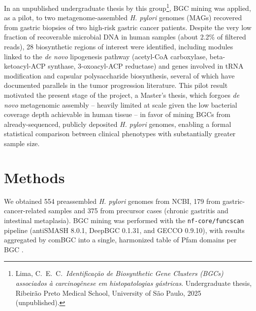 \documentclass[12pt]{article}
\begin{document}
In an unpublished undergraduate thesis by this group\footnote{Lima, C.\ E.\ C.\ \textit{Identificação de Biosynthetic Gene Clusters (BGCs) associados à carcinogênese em histopatologias gástricas}. Undergraduate thesis, Ribeirão Preto Medical School, University of São Paulo, 2025 (unpublished).}, BGC mining was applied, as a pilot, to two metagenome-assembled \textit{H. pylori} genomes (MAGs) recovered from gastric biopsies of two high-risk gastric cancer patients. Despite the very low fraction of recoverable microbial DNA in human samples (about 2.2\% of filtered reads), 28 biosynthetic regions of interest were identified, including modules linked to the \textit{de novo} lipogenesis pathway (acetyl-CoA carboxylase, beta-ketoacyl-ACP synthase, 3-oxoacyl-ACP reductase) and genes involved in tRNA modification and capsular polysaccharide biosynthesis, several of which have documented parallels in the tumor progression literature. This pilot result motivated the present stage of the project, a Master's thesis, which forgoes \textit{de novo} metagenomic assembly -- heavily limited at scale given the low bacterial coverage depth achievable in human tissue -- in favor of mining BGCs from already-sequenced, publicly deposited \textit{H. pylori} genomes, enabling a formal statistical comparison between clinical phenotypes with substantially greater sample size.

\section{Methods}

We obtained 554 preassembled \textit{H. pylori} genomes from NCBI, 179 from gastric-cancer-related samples and 375 from precursor cases (chronic gastritis and intestinal metaplasia). BGC mining was performed with the \texttt{nf-core/funcscan} pipeline (antiSMASH 8.0.1, DeepBGC 0.1.31, and GECCO 0.9.10), with results aggregated by comBGC into a single, harmonized table of Pfam domains per BGC \cite{ewels2020,ditommaso2017,frangenberg2024}.
\end{document}
